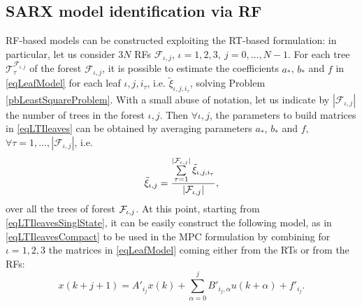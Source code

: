 \subsection{SARX model identification via RF} RF-based models can be constructed exploiting the RT-based formulation: in particular, let us consider $3 N$ RFs $\mathcal{F}_{\iota,j}$, $\iota = 1,2,3,\ j = 0,\ldots,N-1$. 
For each tree $\mathcal{T}^{\mathcal{F}_{\iota,j}}_\tau$ of the forest $\mathcal{F}_{\iota,j}$, it is possible to estimate the coefficients $a_*$, $b_*$ and $f$ in \eqref{eqLeafModel} for each leaf $\iota,j,i_\tau$, i.e. $\tilde\xi_{\iota,j,i_\tau}$, solving Problem \ref{pbLeastSquareProblem}.
With a small abuse of notation, let us indicate by $|\mathcal{F}_{\iota,j}|$ the number of trees in the forest ${\iota,j}$. 
Then $\forall \iota,j$, the parameters to build matrices in \eqref{eqLTIleaves} can be obtained by averaging parameters $a_*$, $b_*$ and $f$, $\forall \tau = 1,\ldots,|\mathcal{F}_{\iota,j}|$, i.e.
\begin{equation}\label{eqAverageRF}
\tilde\xi_{\iota,j} = \frac{\sum\limits_{\tau=1}^{|\mathcal{F}_{\iota,j}|}\tilde\xi_{\iota,j,i_\tau}}{|\mathcal{F}_{\iota,j}|},
\end{equation}
over all the trees of forest $\mathcal{F}_{\iota,j}$. At this point, starting from \eqref{eqLTIleavesSinglState}, it can be easily construct the following model, as in \eqref{eqLTIleavesCompact} to be used in the MPC formulation by combining for $\iota=1,2,3$ the matrices in \eqref{eqLeafModel} coming either from the RTs or from the RFs:
\begin{equation}\label{eqLTIleaves}
	x(k+j+1) = A'_{i_j}x(k) + \sum_{\alpha = 0}^{j}{B'_{i_j,\alpha}u(k+\alpha)} + f'_{i_j}.
\end{equation}


